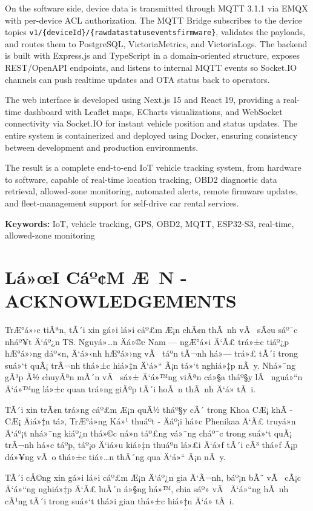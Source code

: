 \documentclass[a4paper]{extarticle}
\newcommand{\majorheading}[1]{%
  \clearpage
  \phantomsection
  \section*{#1}%
  \addcontentsline{toc}{section}{#1}%
}
\begin{document}
On the software side, device data is transmitted through MQTT 3.1.1 via
EMQX with per-device ACL authorization. The MQTT Bridge subscribes to
the device topics
\texttt{v1/\{deviceId\}/\{rawdata\textbar status\textbar events\textbar firmware\}},
validates the payloads, and routes them to PostgreSQL, VictoriaMetrics,
and VictoriaLogs. The backend is built with Express.js and TypeScript in
a domain-oriented structure, exposes REST/OpenAPI endpoints, and listens
to internal MQTT events so Socket.IO channels can push realtime updates
and OTA status back to operators.

The web interface is developed using Next.js 15 and React 19, providing
a real-time dashboard with Leaflet maps, ECharts visualizations, and
WebSocket connectivity via Socket.IO for instant vehicle position and
status updates. The entire system is containerized and deployed using
Docker, ensuring consistency between development and production
environments.

The result is a complete end-to-end IoT vehicle tracking system, from
hardware to software, capable of real-time location tracking, OBD2
diagnostic data retrieval, allowed-zone monitoring, automated alerts,
remote firmware updates, and fleet-management support for self-drive car
rental services.

\textbf{Keywords:} IoT, vehicle tracking, GPS, OBD2, MQTT, ESP32-S3,
real-time, allowed-zone monitoring

\majorheading{Lá»œI Cáº¢M Æ N - ACKNOWLEDGEMENTS}\label{lux1eddi-cux1ea3m-ux1a1n---acknowledgements}

TrÆ°á»›c tiÃªn, tÃ´i xin gá»­i lá»i cáº£m Æ¡n chÃ¢n thÃ nh vÃ  sÃ¢u sáº¯c nháº¥t Ä‘áº¿n TS.
Nguyá»…n Äá»©c Nam --- ngÆ°á»i Ä‘Ã£ trá»±c tiáº¿p hÆ°á»›ng dáº«n, Ä‘á»‹nh hÆ°á»›ng vÃ  táº­n tÃ¬nh
há»— trá»£ tÃ´i trong suá»‘t quÃ¡ trÃ¬nh thá»±c hiá»‡n Ä‘á»“ Ã¡n tá»‘t nghiá»‡p nÃ y. Nhá»¯ng
gÃ³p Ã½ chuyÃªn mÃ´n vÃ  sá»± Ä‘á»™ng viÃªn cá»§a tháº§y lÃ  nguá»“n Ä‘á»™ng lá»±c quan trá»ng
giÃºp tÃ´i hoÃ n thÃ nh Ä‘á» tÃ i.

TÃ´i xin trÃ¢n trá»ng cáº£m Æ¡n quÃ½ tháº§y cÃ´ trong Khoa CÆ¡ khÃ­ - CÆ¡ Äiá»‡n tá»­,
TrÆ°á»ng Ká»¹ thuáº­t - Äáº¡i há»c Phenikaa Ä‘Ã£ truyá»n Ä‘áº¡t nhá»¯ng kiáº¿n thá»©c ná»n
táº£ng vá»¯ng cháº¯c trong suá»‘t quÃ¡ trÃ¬nh há»c táº­p, táº¡o Ä‘iá»u kiá»‡n thuáº­n lá»£i Ä‘á»ƒ
tÃ´i cÃ³ thá»ƒ Ã¡p dá»¥ng vÃ o thá»±c tiá»…n thÃ´ng qua Ä‘á»“ Ã¡n nÃ y.

TÃ´i cÅ©ng xin gá»­i lá»i cáº£m Æ¡n Ä‘áº¿n gia Ä‘Ã¬nh, báº¡n bÃ¨ vÃ  cÃ¡c Ä‘á»“ng nghiá»‡p Ä‘Ã£
luÃ´n á»§ng há»™, chia sáº» vÃ  Ä‘á»“ng hÃ nh cÃ¹ng tÃ´i trong suá»‘t thá»i gian thá»±c
hiá»‡n Ä‘á» tÃ i.
\end{document}
